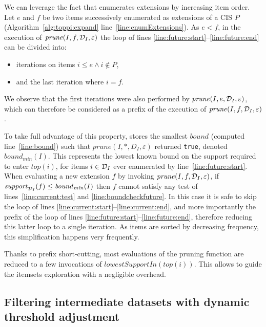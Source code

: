 We can leverage the fact that \toppi enumerates extensions by increasing item order.
Let $e$ and $f$ be two items successively enumerated as extensions of a CIS $P$
(Algorithm~\ref{alg:toppi:expand} line~\ref{line:enumExtensions}).
As $e<f$, in the execution of $\mathit{prune}(I,f,{\cal D}_I,\varepsilon)$
the loop of lines \ref{line:future:start}--\ref{line:future:end}
can be divided into:
\begin{itemize}
	\item iterations on items $i \leq e \wedge i \not\in P$,
	\item and the last iteration where $i=f$.
\end{itemize}

We observe that the first iterations were also performed by $\mathit{prune}(I,e,{\cal D}_I,\varepsilon)$,
which can therefore be considered as a prefix of the execution of $\mathit{prune}(I,f,{\cal D}_I,\varepsilon)$.

To take full advantage of this property,
\toppi stores the smallest $\mathit{bound}$ (computed line~\ref{line:bound}) such that
$\mathit{prune}(I, \ast, D_I, \varepsilon)$ returned \verb|true|,
denoted $\mathit{bound}_\mathit{min}(I)$.
This represents the lowest known bound on the support required to enter
$\mathit{top}(i)$, for items $i \in {\cal D}_I$
ever enumerated by line~\ref{line:future:start}.
When evaluating a new extension $f$ by invoking $\mathit{prune}(I,f,{\cal D}_I,\varepsilon)$,
if $\mathit{support}_{{\cal D}_I}(f) \leq \mathit{bound}_\mathit{min}(I)$
then $f$ cannot satisfy any test of lines~\ref{line:current:test} and \ref{line:boundcheckfuture}.
In this case it is safe to skip the loop of lines \ref{line:current:start}--\ref{line:current:end},
and more importantly the prefix of the loop of lines \ref{line:future:start}--\ref{line:future:end},
therefore reducing this latter loop to a single iteration.
As items are sorted by decreasing frequency,
this simplification happens very frequently.

Thanks to prefix short-cutting,
most evaluations of the pruning function are reduced to a few invocations of $\mathit{lowestSupportIn(top(i))}$.
This allows \toppi to guide the itemsets exploration with a negligible overhead.



\subsection{Filtering intermediate datasets with dynamic threshold adjustment}
\label{sec:toppi:start}

